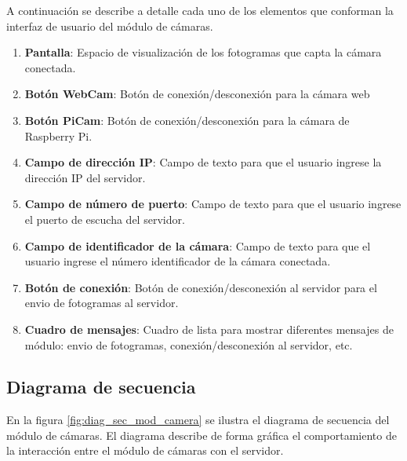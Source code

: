 A continuación se describe a detalle cada uno de los elementos que conforman la interfaz de usuario del módulo de cámaras.
\begin{enumerate}
    \item \textbf{Pantalla}: Espacio de  visualización de los fotogramas que capta la cámara conectada.
    \item \textbf{Botón WebCam}: Botón de conexión/desconexión para la cámara web
    \item \textbf{Botón PiCam}: Botón de conexión/desconexión para la cámara de Raspberry Pi.
    \item \textbf{Campo de dirección IP}: Campo de texto para que el usuario ingrese la dirección IP del servidor.
    \item \textbf{Campo de número de puerto}: Campo de texto para que el usuario ingrese el puerto de escucha del servidor.
    \item \textbf{Campo de identificador de la cámara}: Campo de texto para que el usuario ingrese el número identificador de la cámara conectada.
    \item \textbf{Botón de conexión}: Botón de conexión/desconexión al servidor para el envio de fotogramas al servidor.
    \item \textbf{Cuadro de mensajes}: Cuadro de lista para mostrar diferentes mensajes de módulo: envio de fotogramas, conexión/desconexión al servidor, etc.
\end{enumerate}

\subsection{Diagrama de secuencia}
En la figura \ref{fig:diag_sec_mod_camera} se ilustra el diagrama de secuencia del módulo de cámaras. El diagrama describe de forma gráfica el comportamiento de la interacción entre el módulo de cámaras con el servidor.

